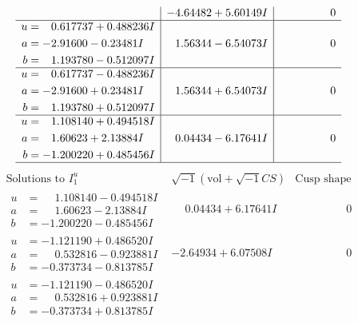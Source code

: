 \documentclass[1p]{elsarticle_modified}
\theoremstyle{definition}
\newcommand{\I}{\sqrt{-1}}
\begin{document}
$$\begin{array}{c|c|c}
 & -4.64482 + 5.60149 I & \phantom{-0.000000 } 0 \\ \hline\begin{aligned}
u &= \phantom{-}0.617737 + 0.488236 I \\
a &= -2.91600 - 0.23481 I \\
b &= \phantom{-}1.193780 - 0.512097 I\end{aligned}
 & \phantom{-}1.56344 - 6.54073 I & \phantom{-0.000000 } 0 \\ \hline\begin{aligned}
u &= \phantom{-}0.617737 - 0.488236 I \\
a &= -2.91600 + 0.23481 I \\
b &= \phantom{-}1.193780 + 0.512097 I\end{aligned}
 & \phantom{-}1.56344 + 6.54073 I & \phantom{-0.000000 } 0 \\ \hline\begin{aligned}
u &= \phantom{-}1.108140 + 0.494518 I \\
a &= \phantom{-}1.60623 + 2.13884 I \\
b &= -1.200220 + 0.485456 I\end{aligned}
 & \phantom{-}0.04434 - 6.17641 I & \phantom{-0.000000 } 0\\
 \hline 
 \end{array}$$\newpage$$\begin{array}{c|c|c}  
\text{Solutions to }I^u_{1}& \I (\text{vol} + \sqrt{-1}CS) & \text{Cusp shape}\\
 \hline 
\begin{aligned}
u &= \phantom{-}1.108140 - 0.494518 I \\
a &= \phantom{-}1.60623 - 2.13884 I \\
b &= -1.200220 - 0.485456 I\end{aligned}
 & \phantom{-}0.04434 + 6.17641 I & \phantom{-0.000000 } 0 \\ \hline\begin{aligned}
u &= -1.121190 + 0.486520 I \\
a &= \phantom{-}0.532816 - 0.923881 I \\
b &= -0.373734 - 0.813785 I\end{aligned}
 & -2.64934 + 6.07508 I & \phantom{-0.000000 } 0 \\ \hline\begin{aligned}
u &= -1.121190 - 0.486520 I \\
a &= \phantom{-}0.532816 + 0.923881 I \\
b &= -0.373734 + 0.813785 I\end{aligned}

\end{array}$$
\end{document}
